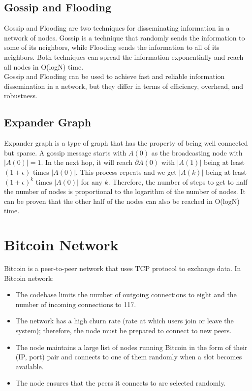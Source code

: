 \documentclass{report}
\begin{document}
\subsection{Gossip and Flooding}
Gossip and Flooding are two techniques for disseminating information in a network of nodes. Gossip is a technique that randomly sends the information to some of its neighbors, while Flooding sends the information to all of its neighbors. Both techniques can spread the information exponentially and reach all nodes in O(logN) time.\\
Gossip and Flooding can be used to achieve fast and reliable information dissemination in a network, but they differ in terms of efficiency, overhead, and robustness.
\subsection{Expander Graph}
Expander graph is a type of graph that has the property of being well connected but sparse. 
A gossip message starts with $A(0)$ as the broadcasting node with $|A(0)| = 1$. In the next hop, it will reach $\partial A(0)$ with $|A(1)|$ being at least $(1 + \epsilon)$ times $|A(0)|$. This process repeats and we get $|A(k)|$ being at least $(1 + \epsilon)^k$ times $|A(0)|$ for any $k$. Therefore, the number of steps to get to half the number of nodes is proportional to the logarithm of the number of nodes. It can be proven that the other half of the nodes can also be reached in O(logN) time.

\section{Bitcoin Network}
Bitcoin is a peer-to-peer network that uses TCP protocol to exchange data. In Bitcoin network:
\begin{itemize}
	\item The codebase limits the number of outgoing connections to eight and the number of incoming connections to 117.
	\item The network has a high churn rate (rate at which users join or leave the system); therefore, the node must be prepared to connect to new peers.
	\item The node maintains a large list of nodes running Bitcoin in the form of their (IP, port) pair and connects to one of them randomly when a slot becomes available.
	\item The node ensures that the peers it connects to are selected randomly.
\end{itemize}
\end{document}
